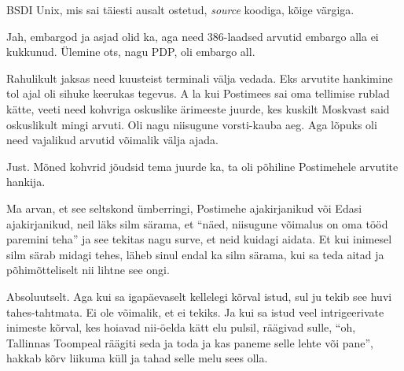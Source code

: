 
BSDI Unix, mis sai täiesti ausalt ostetud, \emph{source} 
koodiga,  kõige värgiga. 


Jah, embargod ja asjad olid ka, aga need 386-laadsed arvutid embargo alla ei 
kukkunud. Ülemine ots, nagu PDP, oli embargo all. 

Rahulikult jaksas need kuusteist terminali välja vedada. Eks arvutite hankimine 
tol ajal oli  sihuke keerukas tegevus. A la kui  Postimees sai oma tellimise 
rublad kätte,  veeti need kohvriga oskuslike ärimeeste juurde, kes kuskilt 
Moskvast said oskuslikult mingi arvuti. Oli nagu niisugune vorsti-kauba aeg. 
Aga lõpuks oli need vajalikud arvutid võimalik välja ajada.


Just. Mõned kohvrid jõudsid tema juurde ka, ta oli põhiline Postimehele 
arvutite hankija.


Ma arvan, et  see seltskond ümberringi, Postimehe ajakirjanikud või Edasi 
ajakirjanikud, neil läks silm särama, et \enquote{näed, niisugune võimalus on  
oma tööd paremini teha} ja see tekitas nagu surve, et neid kuidagi aidata. Et 
kui inimesel silm särab midagi tehes, läheb sinul endal ka silm särama, kui sa 
teda aitad ja põhimõtteliselt nii lihtne see ongi.


Absoluutselt. Aga kui sa igapäevaselt kellelegi kõrval istud, sul ju tekib see 
huvi tahes-tahtmata. Ei ole võimalik, et ei tekiks. Ja kui sa istud veel 
intrigeerivate inimeste kõrval, kes hoiavad nii-öelda  kätt elu pulsil, 
räägivad sulle, \enquote{oh,  Tallinnas Toompeal räägiti seda ja toda ja kas 
paneme selle lehte või pane}, hakkab kõrv liikuma küll ja tahad selle  melu 
sees olla.


